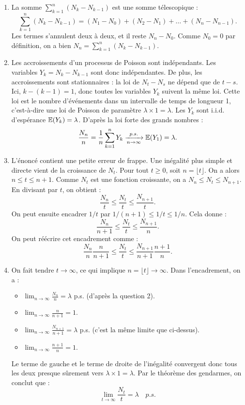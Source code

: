 \documentclass[solutions]{exercices}
\begin{document}
\begin{solution}
\begin{enumerate}
    \item La somme $\sum_{k=1}^n (N_k-N_{k-1})$ est une somme télescopique :
    \[ \sum_{k=1}^n (N_k-N_{k-1}) = (N_1-N_0) + (N_2-N_1) + \dots + (N_n-N_{n-1}). \]
    Les termes s'annulent deux à deux, et il reste $N_n - N_0$. Comme $N_0=0$ par définition, on a bien $N_n=\sum_{k=1}^n (N_k-N_{k-1})$.
    \item Les accroissements d'un processus de Poisson sont indépendants. Les variables $Y_k = N_k - N_{k-1}$ sont donc indépendantes. De plus, les accroissements sont stationnaires : la loi de $N_t - N_s$ ne dépend que de $t-s$. Ici, $k-(k-1)=1$, donc toutes les variables $Y_k$ suivent la même loi. Cette loi est le nombre d'événements dans un intervalle de temps de longueur 1, c'est-à-dire une loi de Poisson de paramètre $\lambda \times 1 = \lambda$.
    Les $Y_k$ sont i.i.d. d'espérance $\mathbb{E}(Y_k) = \lambda$. D'après la loi forte des grands nombres :
    \[ \frac{N_n}{n} = \frac{1}{n}\sum_{k=1}^n Y_k \xrightarrow[n\to\infty]{p.s.} \mathbb{E}(Y_1) = \lambda. \]
    \item L'énoncé contient une petite erreur de frappe. Une inégalité plus simple et directe vient de la croissance de $N_t$.
    Pour tout $t \ge 0$, soit $n = \lfloor t \rfloor$. On a alors $n \le t \le n+1$.
    Comme $N_t$ est une fonction croissante, on a $N_n \le N_t \le N_{n+1}$.
    En divisant par $t$, on obtient :
    \[ \frac{N_n}{t} \le \frac{N_t}{t} \le \frac{N_{n+1}}{t}. \]
    On peut ensuite encadrer $1/t$ par $1/(n+1) \le 1/t \le 1/n$. Cela donne :
    \[ \frac{N_n}{n+1} \le \frac{N_t}{t} \le \frac{N_{n+1}}{n}. \]
    On peut réécrire cet encadrement comme :
    \[ \frac{N_n}{n} \frac{n}{n+1} \le \frac{N_t}{t} \le \frac{N_{n+1}}{n+1} \frac{n+1}{n}. \]
    \item On fait tendre $t \to \infty$, ce qui implique $n = \lfloor t \rfloor \to \infty$.
    Dans l'encadrement, on a :
    \begin{itemize}
        \item $\lim_{n\to\infty} \frac{N_n}{n} = \lambda$ p.s. (d'après la question 2).
        \item $\lim_{n\to\infty} \frac{n}{n+1} = 1$.
        \item $\lim_{n\to\infty} \frac{N_{n+1}}{n+1} = \lambda$ p.s. (c'est la même limite que ci-dessus).
        \item $\lim_{n\to\infty} \frac{n+1}{n} = 1$.
    \end{itemize}
    Le terme de gauche et le terme de droite de l'inégalité convergent donc tous les deux presque sûrement vers $\lambda \times 1 = \lambda$.
    Par le théorème des gendarmes, on conclut que :
    \[ \lim_{t\to\infty} \frac{N_t}{t} = \lambda \quad p.s. \]
\end{enumerate}
\end{solution}
\end{document}

